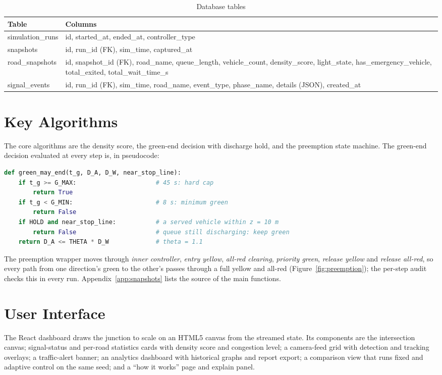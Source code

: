 \begin{table}[H]
\centering
\caption{Database tables}
\label{tab:schema}
\small
\begin{tabular}{@{}p{3.3cm}p{11.4cm}@{}}
\toprule
\textbf{Table} & \textbf{Columns} \\
\midrule
simulation\_runs & id, started\_at, ended\_at, controller\_type \\
snapshots & id, run\_id (FK), sim\_time, captured\_at \\
road\_snapshots & id, snapshot\_id (FK), road\_name, queue\_length, vehicle\_count, density\_score, light\_state, has\_emergency\_vehicle, total\_exited, total\_wait\_time\_s \\
signal\_events & id, run\_id (FK), sim\_time, road\_name, event\_type, phase\_name, details (JSON), created\_at \\
\bottomrule
\end{tabular}
\end{table}

\section{Key Algorithms}
The core algorithms are the density score, the green-end decision with discharge hold, and the preemption state machine. The green-end decision evaluated at every step is, in pseudocode:

\begin{lstlisting}[language=Python, caption={Green-end decision with discharge hold}]
def green_may_end(t_g, D_A, D_W, near_stop_line):
    if t_g >= G_MAX:                      # 45 s: hard cap
        return True
    if t_g < G_MIN:                       # 8 s: minimum green
        return False
    if HOLD and near_stop_line:           # a served vehicle within z = 10 m
        return False                      # queue still discharging: keep green
    return D_A <= THETA * D_W             # theta = 1.1
\end{lstlisting}

The preemption wrapper moves through \emph{inner controller}, \emph{entry yellow}, \emph{all-red clearing}, \emph{priority green}, \emph{release yellow} and \emph{release all-red}, so every path from one direction's green to the other's passes through a full yellow and all-red (Figure~\ref{fig:preemption}); the per-step audit checks this in every run. Appendix~\ref{app:snapshots} lists the source of the main functions.

\section{User Interface}
\label{sec:ui}
The React dashboard draws the junction to scale on an HTML5 canvas from the streamed state. Its components are the intersection canvas; signal-status and per-road statistics cards with density score and congestion level; a camera-feed grid with detection and tracking overlays; a traffic-alert banner; an analytics dashboard with historical graphs and report export; a comparison view that runs fixed and adaptive control on the same seed; and a ``how it works'' page and explain panel.

